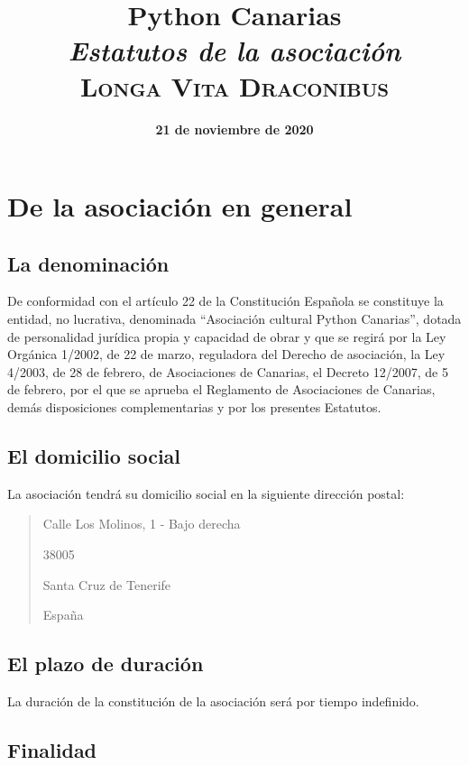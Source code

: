 \documentclass[a4paper, 12pt, oneside]{book}
\title{
    \huge \textbf{Python Canarias} \\
    \textit{Estatutos de la asociación} \\
    \vspace{1cm}
    \large \textsc{Longa Vita Draconibus}
}
\date{\textbf{21 de noviembre de 2020}}
\author{}
\begin{document}
\maketitle

\tableofcontents

\chapter{De la asociación en general}

\section{La denominación}

De conformidad con el artículo 22 de la Constitución Española se constituye la entidad, no lucrativa, denominada ``Asociación cultural Python Canarias'', dotada de personalidad jurídica propia y capacidad de obrar y que se regirá por la Ley Orgánica 1/2002, de 22 de marzo, reguladora del Derecho de asociación, la Ley 4/2003, de 28 de febrero, de Asociaciones de Canarias, el Decreto 12/2007, de 5 de febrero, por el que se aprueba el Reglamento de Asociaciones de Canarias, demás disposiciones complementarias y por los presentes Estatutos.

\section{El domicilio social}

La asociación tendrá su domicilio social en la siguiente dirección postal:

\begin{quotation}
    Calle Los Molinos, 1 - Bajo derecha

    38005

    Santa Cruz de Tenerife

    España
\end{quotation}

\section{El plazo de duración}

La duración de la constitución de la asociación será por tiempo indefinido.

\section{Finalidad}
\end{document}
